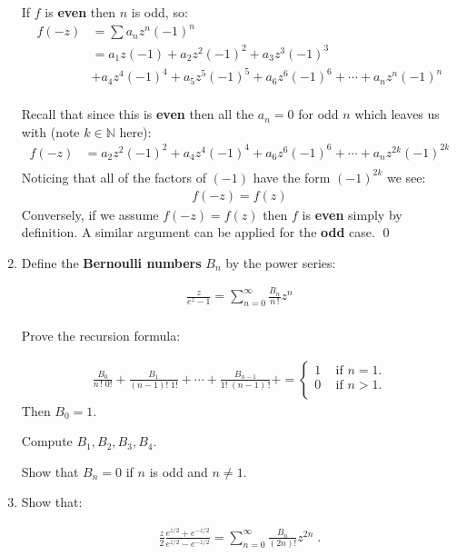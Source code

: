 \begin{enumerate}
  If $f$ is \textbf{even} then $n$ is odd, so:
  \begin{align*}
    f(-z) &= \sum a_n z^n (-1)^n \\
    &= a_1 z (-1) + a_2 z^2 (-1)^2 + a_3 z^3 (-1)^3 \\
    &+ a_4 z^4 (-1)^4 + a_5 z^5 (-1)^5 + a_6 z^6 (-1)^6 + \cdots + a_n z^n (-1)^n \\
  \end{align*}

  Recall that since this is \textbf{even} then all the $a_n = 0$ for odd $n$ which leaves us with (note $k \in \mathbb{N}$ here):
  \begin{align*}
    f(-z) &= a_2 z^2 (-1)^2 + a_4 z^4 (-1)^4 + a_6 z^6 (-1)^6 + \cdots + a_n z^{2k} (-1)^{2k} \\
  \end{align*} 
  Noticing that all of the factors of $(-1)$ have the form $(-1)^{2k}$ we see:
  \begin{align*}
    f(-z) = f(z)
  \end{align*}
  Conversely, if we assume $f(-z) = f(z)$ then $f$ is \textbf{even} simply by definition. 
  A similar argument can be applied for the \textbf{odd} case.
  \qed

  \item Define the \textbf{Bernoulli numbers} $B_n$ by the power series:

  \begin{align*}
    \frac{z}{e^z - 1} = \sum_{n = 0}^{\infty}\frac{B_n}{n\,!}z^n \\
  \end{align*}

  Prove the recursion formula:

  \begin{align*}
    \frac{B_0}{n \, ! \; 0!} + \frac{B_1}{(n - 1)! \; 1!} + \cdots + \frac{B_{n - 1}}{1! \; (n - 1)\,!} + = 
    \begin{cases}
      1 \;\;\; \text{   if } n = 1. \\
      0 \;\;\; \text{   if } n > 1. \\
    \end{cases}
  \end{align*}
  Then $B_0 = 1.$
  
  Compute $B_1, B_2, B_3, B_4.$
  
  Show that $B_n = 0$ if $n$ is odd and $n \not = 1.$
  
  \item Show that:

  \begin{align*}
    \frac{z}{2} \frac{e^{z/2} + e^{-z/2}}{e^{z/2} - e^{-z/2}} = \sum_{n = 0}^\infty \frac{B_n}{(2n)!}z^{2n} \;. \\
  \end{align*}


\end{enumerate}
